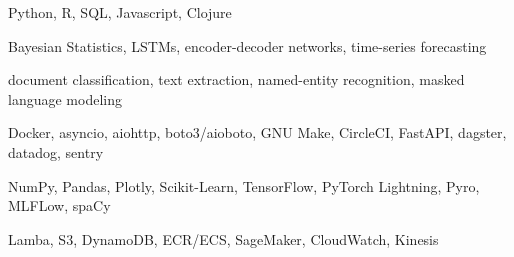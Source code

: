 \begin{cvskills}

	{Python, R, SQL, Javascript, Clojure}

	{Bayesian Statistics, LSTMs, encoder-decoder networks, time-series forecasting}

	{document classification, text extraction, named-entity recognition, masked language modeling}

	{Docker, asyncio, aiohttp, boto3/aioboto, GNU Make, CircleCI, FastAPI, dagster, datadog, sentry}

	{NumPy, Pandas, Plotly, Scikit-Learn, TensorFlow, PyTorch Lightning, Pyro, MLFLow, spaCy}

	{Lamba, S3, DynamoDB, ECR/ECS, SageMaker, CloudWatch, Kinesis}

\end{cvskills}
